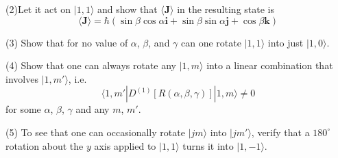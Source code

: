 \documentclass[../principles-of-quantum-mechanics.tex]{subfiles}
\begin{document}
\begin{questions}
		(2)Let it act on $|1, 1\rangle$ and show that $\langle\mathbf{J}\rangle$ in the resulting state is
		$$\langle\mathbf{J}\rangle = \hbar(\sin\beta\cos\alpha\mathbf{i} + \sin\beta\sin\alpha\mathbf{j} + \cos\beta\mathbf{k})$$
		
		(3) Show that for no value of $\alpha$, $\beta$, and $\gamma$ can one rotate $|1, 1\rangle$ into just $|1, 0\rangle$.
		
		(4) Show that one can always rotate any $|1, m\rangle$ into a linear combination that involves $|1, m'\rangle$, i.e.
		$$\langle 1, m'|D^{(1)}[R(\alpha, \beta, \gamma)]|1, m\rangle \neq 0$$
		for some $\alpha$, $\beta$, $\gamma$ and any $m$, $m'$.
		
		(5) To see that one can occasionally rotate $|jm\rangle$ into $|jm'\rangle$, verify that a $180^\circ$ rotation about the $y$ axis applied to $|1, 1\rangle$ turns it into $|1, -1\rangle$.
		

\end{questions}
\end{document}
